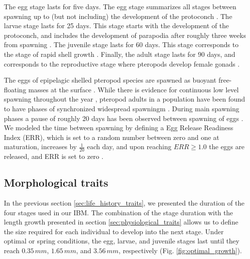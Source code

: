 The egg stage lasts for five days. The egg stage summarizes all stages between spawning up to (but not including) the development of the protoconch \citep{Thabet2015Lifestages}. The larvae stage lasts for 25 days. This stage starts with the development of the protoconch, and includes the development of parapodia after roughly three weeks from spawning \citep{Thabet2015Lifestages}. The juvenile stage lasts for 60 days. This stage corresponds to the stage of rapid shell growth \citep{Thabet2015Lifestages}. Finally, the adult stage lasts for 90 days, and corresponds to the reproductive stage where pteropods develop female gonads \cite{lalli1989pelagic,Thabet2015Lifestages,Bednarsek2016CumulativeEffects}.


The eggs of epipelagic shelled pteropod species are spawned as buoyant free-floating masses at the surface \citep{Lalli1978Reproduction,Paranjape1968egg,Schalk1990SeasonalSpatial,Gannefors2005Overwintering,Comeau2010Predation,Manno2016EggsAcidification}. While there is evidence for continuous low level spawning  throughout the year \citep{Wang2017Lifecycle,Thabet2015Lifestages}, pteropod  adults in a population have been found to have phases of synchronized widespread spawningm \citep[e.g. in spring and autumn][]{lalli1989pelagic,Thabet2015Lifestages,Wang2017Lifecycle}. During main spawning phases a pause of roughly 20 days has been observed between spawning of eggs \citep{Paranjape1968egg}. We modeled the time between spawning by defining a Egg Release Readiness Index (ERR), which is set to a random number between zero and one at maturation, increases by $\frac{1}{20}$ each day, and upon reaching $ERR \geq 1.0$ the eggs are released, and ERR is set to zero \citep[similar to the Clutch Readines Fraction presented in ][]{Miller1998CalanusIBM}.



\subsection{Morphological traits}

In the previous section \ref{sec:life_history_traits}, we presented the duration of the four stages used in our IBM. The combination of the stage duration with the length growth presented in section \ref{sec:physiological_traits} allows us to define the size required for each individual to develop into the next stage. Under optimal or spring conditions, the egg, larvae, and juvenile stages last until they reach $0.35\,mm$, $1.65\, mm$, and $3.56\, mm$, respectively (Fig. \ref{fig:optimal_growth}). 

